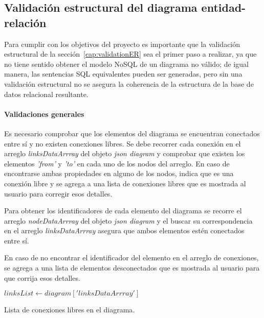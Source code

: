 \subsection{Validación estructural del diagrama entidad-relación}

Para cumplir con los objetivos del proyecto es importante que la validación estructural de la sección~\ref{cap:validationER} sea el primer paso a realizar, ya que no tiene sentido obtener el modelo NoSQL de un diagrama no válido; de igual manera, las sentencias SQL equivalentes pueden ser generadas, pero sin una validación estructural no se asegura la coherencia de la estructura de la base de datos relacional resultante.

\paragraph*{Validaciones generales}

Es necesario comprobar que los elementos del diagrama se encuentran conectados entre sí y no existen conexiones libres. Se debe recorrer cada conexión en el arreglo \textit{linksDataArrray} del objeto \textit{json diagram} y comprobar que existen los elementos \textit{'from'} y \textit{'to'} en cada uno de los nodos del arreglo.  En caso de encontrarse ambas propiedades en alguno de los nodos, indica que es una conexión libre y se agrega a una lista de conexiones libres que es mostrada al usuario para corregir esos detalles.


Para obtener los identificadores de cada elemento del diagrama se recorre el arreglo \textit{nodeDataArrray} del objeto \textit{json diagram} y el buscar su correspondencia en el arreglo  \textit{linksDataArrray} asegura que ambos elementos estén conectados entre sí.


En caso de no encontrar el identificador del elemento en el arreglo de conexiones, se agrega a una lista de elementos desconectados que es mostrada al usuario para que corrija esos detalles.


\begin{algorithm}[H]

  $linksList \gets diagram['linksDataArrray']$\\
  
  \caption{Lista de conexiones libres en el diagrama.}
\end{algorithm}

